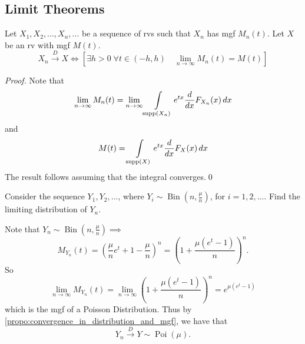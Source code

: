 \documentclass[notoc,notitlepage]{tufte-book}
\DeclareMathOperator{\Bin}{Bin }
\DeclareMathOperator{\Poi}{Poi }
\DeclareMathOperator{\supp}{supp }
\newcommand{\convd}{\overset{D}{\to}}
\begin{document}

\subsection{Limit Theorems}%
\label{sub:limit_theorems}

\begin{propo}
\label{propo:convergence_in_distribution_and_mgf}
Let $X_1, X_2, ..., X_n, ...$ be a sequence of rvs such that $X_n$ has mgf $M_n(t)$. Let $X$ be an rv with mgf $M(t)$.
\begin{equation*}
  X_n \convd X \iff \left[ \exists h > 0 \; \forall t \in (-h, h) \quad \lim_{n \to \infty} M_n(t) = M(t) \right]
\end{equation*}
\end{propo}

\begin{proof}
  Note that
  \begin{equation*}
    \lim_{n \to \infty} M_n(t) = \lim_{n \to \infty} \int\limits_{\supp(X_n)} e^{tx} \frac{d}{dx} F_{X_n} (x) \dif{x} 
  \end{equation*}
  and
  \begin{equation*}
    M(t) = \int\limits_{\supp(X)} e^{tx} \frac{d}{dx} F_X(x) \dif{x} 
  \end{equation*}
  The result follows assuming that the integral converges.\qed
\end{proof}

\begin{eg}
  Consider the sequence $Y_1, Y_2, ...$, where $Y_i \sim \Bin\left(n , \frac{\mu}{n}\right)$, for $i = 1, 2, ...$. Find the limiting distribution of $Y_n$.
\end{eg}

\begin{solution}[Example 5.6]
  Note that $Y_n \sim \Bin\left(n, \frac{\mu}{n}\right) \implies$
  \begin{equation*}
    M_{Y_n}(t) = \left( \frac{\mu}{n} e^t + 1 - \frac{\mu}{n}\right)^n = \left( 1 + \frac{\mu \left( e^t - 1 \right)}{n} \right)^n.
  \end{equation*}
  So
  \begin{equation*}
    \lim_{n \to \infty} M_{Y_n}(t) = \lim_{n \to \infty} \left( 1 + \frac{\mu \left( e^t - 1 \right)}{n} \right)^n = e^{\mu \left(e^t - 1\right)}
  \end{equation*}
  which is the mgf of a Poisson Distribution. Thus by \cref{propo:convergence_in_distribution_and_mgf}, we have that
  \begin{equation*}
    Y_n \convd Y \sim \Poi(\mu).
  \end{equation*}
\end{solution}
\end{document}
